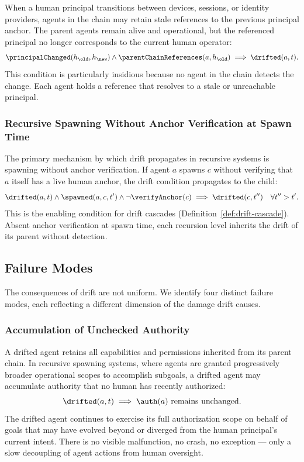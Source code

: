 When a human principal transitions between devices, sessions, or identity providers, agents in the chain may retain stale references to the previous principal anchor. The parent agents remain alive and operational, but the referenced principal no longer corresponds to the current human operator:
\begin{equation}
\principalChanged(h_{\old}, h_{\new}) \land \parentChainReferences(a, h_{\old}) \implies \drifted(a, t).
\end{equation}
This condition is particularly insidious because no agent in the chain detects the change. Each agent holds a reference that resolves to a stale or unreachable principal.

\subsubsection{Recursive Spawning Without Anchor Verification at Spawn Time}

The primary mechanism by which drift propagates in recursive systems is spawning without anchor verification. If agent $a$ spawns $c$ without verifying that $a$ itself has a live human anchor, the drift condition propagates to the child:
\begin{equation}
\drifted(a, t) \land \spawned(a, c, t') \land \neg \verifyAnchor(c) \implies \drifted(c, t'') \quad \forall t'' > t'.
\label{eq:propagation}
\end{equation}
This is the enabling condition for drift cascades (Definition~\ref{def:drift-cascade}). Absent anchor verification at spawn time, each recursion level inherits the drift of its parent without detection.

\subsection{Failure Modes}

The consequences of drift are not uniform. We identify four distinct failure modes, each reflecting a different dimension of the damage drift causes.

\subsubsection{Accumulation of Unchecked Authority}

A drifted agent retains all capabilities and permissions inherited from its parent chain. In recursive spawning systems, where agents are granted progressively broader operational scopes to accomplish subgoals, a drifted agent may accumulate authority that no human has recently authorized:
\begin{equation}
\drifted(a, t) \implies \auth(a) \text{ remains unchanged}.
\end{equation}
The drifted agent continues to exercise its full authorization scope on behalf of goals that may have evolved beyond or diverged from the human principal's current intent. There is no visible malfunction, no crash, no exception — only a slow decoupling of agent actions from human oversight.

